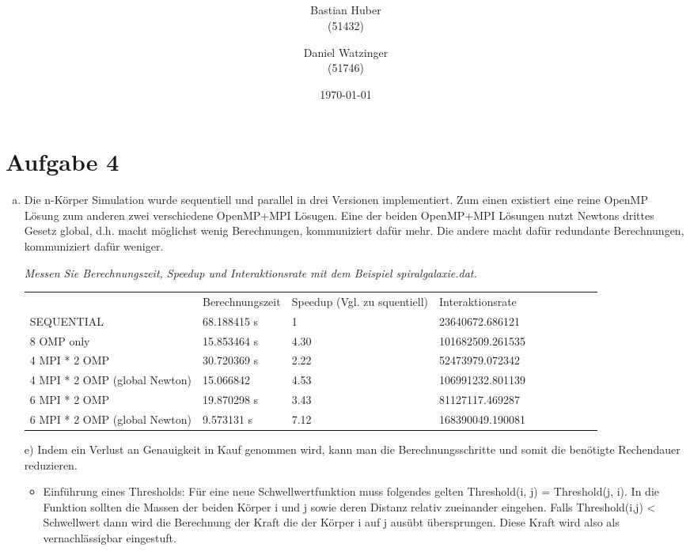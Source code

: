 \documentclass{article}
\author{Bastian Huber\\(51432) \and Daniel Watzinger\\(51746)}
\title{\textbf{\huge{\thetitle}}\\\Large\textsc{}\\\large\textsc{}}
\date{\today}
\begin{document}
\hyphenation{}

\maketitle

\pagestyle{fancy}

\section*{Aufgabe 4}
\begin{enumerate}[a)]
	\item
	Die n-Körper Simulation wurde sequentiell und parallel in drei Versionen implementiert. Zum einen existiert eine reine OpenMP Lösung zum anderen zwei verschiedene OpenMP+MPI Lösugen. Eine der beiden OpenMP+MPI Lösungen nutzt Newtons drittes Gesetz global, d.h. macht möglichst wenig Berechnungen, kommuniziert dafür mehr. Die andere macht dafür redundante Berechnungen, kommuniziert dafür weniger.
	
	\textit{Messen Sie Berechnungszeit, Speedup und Interaktionsrate mit dem Beispiel spiralgalaxie.dat.}
	
	\begin{center}
		\begin{tabular}{llllllllll}
			 	        	& Berechnungszeit & Speedup (Vgl. zu squentiell) & Interaktionsrate \\
			 SEQUENTIAL 	& 68.188415 s		  & 1		& 23640672.686121  \\
			 8 OMP only 		& 15.853464 s		  & 4.30		& 101682509.261535 \\
			 4 MPI * 2 OMP	& 30.720369 s		  &	2.22		& 52473979.072342	\\
			 4 MPI * 2 OMP (global Newton)	& 15.066842		  &	4.53		& 106991232.801139	\\
			 6 MPI * 2 OMP	& 19.870298	s	  &	3.43		& 81127117.469287	\\
			 6 MPI * 2 OMP (global Newton)	& 9.573131 s		  &	7.12		& 168390049.190081	\\		 
		\end{tabular}
		\label{tab:}
	\end{center}
	
	\item[e)]
	Indem ein Verlust an Genauigkeit in Kauf genommen wird, kann man die Berechnungsschritte
	und somit die benötigte Rechendauer reduzieren.
	\begin{itemize}
		\item Einführung eines Thresholds: Für eine neue Schwellwertfunktion muss folgendes
	gelten Threshold(i, j) =  Threshold(j, i). In die Funktion sollten die Massen der beiden
	Körper i und j sowie deren Distanz relativ zueinander eingehen.
	Falls Threshold(i,j) < Schwellwert dann wird die Berechnung der Kraft die der Körper
	i auf j ausübt übersprungen. Diese Kraft
	wird also als vernachlässigbar eingestuft.
	

\end{itemize}
\end{enumerate}
\end{document}
